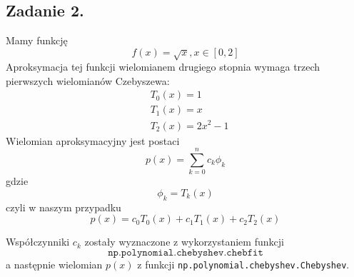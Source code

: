 \documentclass[11pt]{scrartcl}
\begin{document}
    \subsection{Zadanie 2.}
    Mamy funkcję
    \[
        f(x)=\sqrt{x},x \in [0,2]
    \]
    Aproksymacja tej funkcji wielomianem drugiego stopnia
    wymaga trzech pierwszych wielomianów Czebyszewa:
    \begin{align*}
        & T_0(x) = 1 \\
        & T_1(x) = x \\
        & T_2(x) = 2x^2-1
    \end{align*}
    Wielomian aproksymacyjny jest postaci
    \[
        p(x)=\sum_{k=0}^{n}c_k\phi_k
    \]
    gdzie
    \[
        \phi_k=T_k(x)
    \]
    czyli w naszym przypadku
    \[
        p(x)=c_0T_0(x)+c_1T_1(x)+c_2T_2(x)
    \]

    Współczynniki $c_k$ zostały wyznaczone z wykorzystaniem funkcji
    \[
        \texttt{np.polynomial.chebyshev.chebfit}
    \]
    a następnie wielomian $p(x)$ z funkcji
    \texttt{np.polynomial.chebyshev.Chebyshev}.
\end{document}

